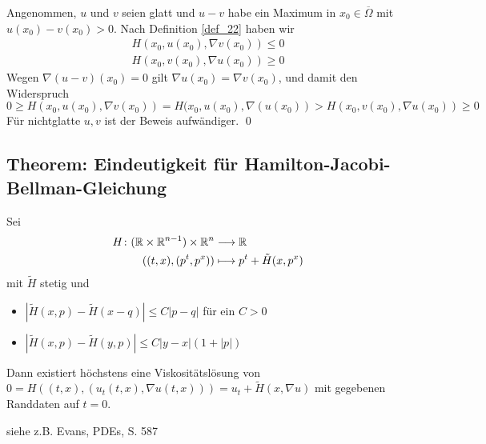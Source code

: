 	Angenommen, $u$ und $v$ seien glatt und $u-v$ habe ein Maximum in $x_0 \in \overline{\Omega}$ mit $u(x_0) - v(x_0) > 0$. Nach Definition \ref{def_22} haben wir
	\[ \begin{array}{c}
		H(x_0,u(x_0),\nabla v(x_0)) \leq 0 \\
		H(x_0,v(x_0),\nabla u(x_0)) \geq 0
	\end{array}\]
	Wegen $\nabla(u-v)(x_0) = 0$ gilt $\nabla u(x_0) = \nabla v(x_0)$, und damit den Widerspruch
	\[ 0 \geq H(x_0,u(x_0),\nabla v(x_0)) = H(x_0,u(x_0),\nabla(u(x_0)) > H(x_0,v(x_0),\nabla u(x_0)) \geq 0 \]
	Für nichtglatte $u,v$ ist der Beweis aufwändiger. \qed
	
\subsection{Theorem: Eindeutigkeit für Hamilton-Jacobi-Bellman-Gleichung}
\label{thm_35}
	Sei \marginnote{[35]}
	\begin{equation}
	\begin{aligned}
		H\colon (\mathbb{R} \times \mathbb{R}^{n-1}) \times \mathbb{R}^n &\longrightarrow \mathbb{R} \\ \notag
		((t,x),(p^t,p^x)) &\longmapsto p^t + \tilde{H}(x,p^x)
	\end{aligned}
	\end{equation}
	mit $\tilde{H}$ stetig und \begin{itemize}
		\item $|\tilde{H}(x,p) - \tilde{H}(x-q)| \leq C|p-q|$ für ein $C > 0$
		\item $|\tilde{H}(x,p) - \tilde{H}(y,p)| \leq C|y-x|(1+|p|)$
	\end{itemize}
	Dann existiert höchstens eine Viskositätslösung von $0 = H((t,x),(u_t(t,x),\nabla u(t,x))) = u_t + \tilde{H}(x,\nabla u)$ mit gegebenen Randdaten auf $t = 0$.
	
	siehe z.B. Evans, \glqq PDEs\grqq, S. 587 
\newpage
